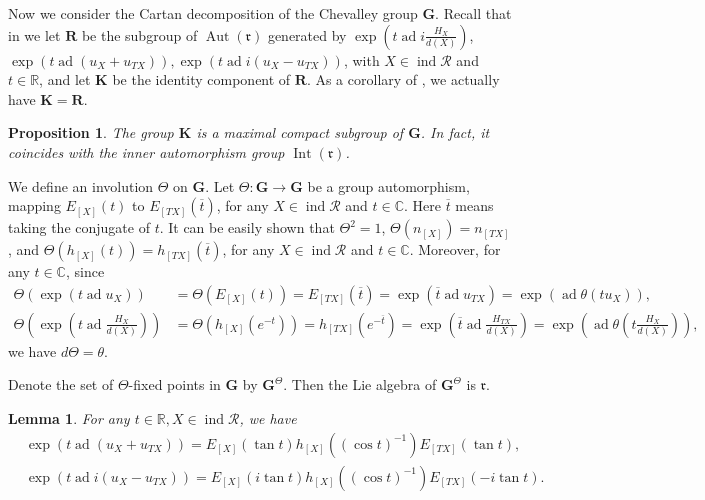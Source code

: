 \documentclass[10pt,a4paper]{amsart}
\newtheorem{lemma}[theorem]{Lemma}
\newtheorem{proposition}[theorem]{Proposition}
\begin{document}
Now we consider the Cartan decomposition of the Chevalley group $\mathbf{G}$.
Recall that in \cite{notes2} we let $\mathbf{R}$ be the subgroup of $\operatorname{Aut}(\mathfrak{r})$ generated by $\operatorname{exp}(t\operatorname{ad}i\frac{H_X}{d(X)})$, $\operatorname{exp}(t\operatorname{ad}(u_X+u_{TX})),\operatorname{exp}(t\operatorname{ad}i(u_X-u_{TX}))$, with $X\in \operatorname{ind}\mathcal{R}$ and $t\in \mathbb{R}$, and let $\mathbf{K}$ be the identity component of $\mathbf{R}$.
As a corollary of \cite[Remark 37]{notes2}, we actually have $\mathbf{K}=\mathbf{R}$.

\begin{proposition}
    \cite[Proposition 36]{notes2}
    The group $\mathbf{K}$ is a maximal compact subgroup of $\mathbf{G}$. 
    In fact, it coincides with the inner automorphism group  $\operatorname{Int}(\mathfrak{r})$.
\end{proposition}

We define an involution $\Theta$ on $\mathbf{G}$.
Let $\Theta:\mathbf{G}\rightarrow \mathbf{G}$ be a group automorphism, mapping $E_{[X]}(t)$ to $E_{[TX]}(\overline{t})$, for any $X\in \operatorname{ind}\mathcal{R}$ and $t\in \mathbb{C}$.
Here $\overline{t}$ means taking the conjugate of $t$.
It can be easily shown that $\Theta^2=1$, $\Theta(n_{[X]})=n_{[TX]}$, and $\Theta(h_{[X]}(t))=h_{[TX]}(\overline{t})$, for any $X\in \operatorname{ind}\mathcal{R}$ and $t\in \mathbb{C}$.
Moreover, for any $t\in \mathbb{C}$, since
\begin{align*}
     \Theta(\operatorname{exp}(t\operatorname{ad}u_X))&=\Theta(E_{[X]}(t))  =E_{[TX]}(\overline{t})=\operatorname{exp}(\overline{t}\operatorname{ad}u_{TX})=\operatorname{exp}(\operatorname{ad}\theta(tu_X)),\\
     \Theta(\operatorname{exp}(t\operatorname{ad}\frac{H_X}{d(X)}))&=\Theta(h_{[X]}(e^{-t}))=h_{[TX]}(e^{-\overline{t}})=\operatorname{exp}(\overline{t}\operatorname{ad}\frac{H_{TX}}{d(X)})=\operatorname{exp}(\operatorname{ad}\theta(t\frac{H_X}{d(X)})),
\end{align*}
we have $d\Theta=\theta$.

Denote the set of $\Theta$-fixed points in $\mathbf{G}$ by $\mathbf{G}^{\Theta}$.
Then the Lie algebra of $\mathbf{G}^{\Theta}$ is $\mathfrak{r}$.

\begin{lemma}
    \cite[Lemma 31]{notes2}
    For any $t\in \mathbb{R}, X\in \operatorname{ind}\mathcal{R}$, we have 
    \begin{align*}
       & \operatorname{exp}(t\operatorname{ad}(u_X+u_{TX}))=E_{[X]}(\operatorname{tan}t)h_{[X]}((\operatorname{cos}t)^{-1})E_{[TX]}(\operatorname{tan}t),\\
        & \operatorname{exp}(t\operatorname{ad}i(u_X-u_{TX}))=E_{[X]}(i\operatorname{tan}t)h_{[X]}((\operatorname{cos}t)^{-1})E_{[TX]}(-i\operatorname{tan}t).
    \end{align*}
\end{lemma}
\end{document}
